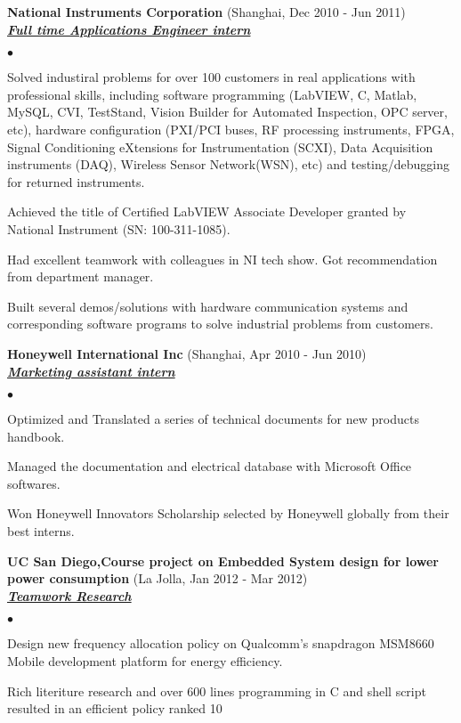 \documentclass{article}
\newcommand{\employer}[3]{{ \textbf{#1} (#2)\\ \underline{\textbf{\emph{#3}}}\\  }}
\newenvironment{achievements}{\begin{list}{$\bullet$}{\topsep 0pt \itemsep -2pt}}{\vspace*{4pt}\end{list}}
\begin{document}
\employer{National Instruments Corporation}{Shanghai, Dec 2010 - Jun 2011}{Full time Applications Engineer intern}
	\begin{achievements}
	\item Solved industiral problems for over 100 customers in real applications with professional skills, including software programming (LabVIEW, C, Matlab, MySQL, CVI, TestStand, Vision Builder for Automated Inspection, OPC server, etc), hardware configuration (PXI/PCI buses, RF processing instruments, FPGA, Signal Conditioning eXtensions for Instrumentation (SCXI), Data Acquisition instruments (DAQ), Wireless Sensor Network(WSN), etc) and testing/debugging for returned instruments.
	\item Achieved the title of Certified LabVIEW Associate Developer granted by National Instrument (SN: 100-311-1085).
	\item Had excellent teamwork with colleagues in NI tech show. Got recommendation from department manager.
	\item Built several demos/solutions with hardware communication systems and corresponding software programs to solve industrial problems from customers.
	\end{achievements}

\employer{Honeywell International Inc}{Shanghai, Apr 2010 - Jun 2010} {Marketing assistant intern}
	\begin{achievements}
	\item Optimized and Translated a series of technical documents for new products handbook.
	\item Managed the documentation and electrical database with Microsoft Office softwares.
	\item Won Honeywell Innovators Scholarship selected by Honeywell globally from their best interns. 
	\end{achievements}

\employer{UC San Diego,Course project on Embedded System design for lower power consumption}{La Jolla, Jan 2012 - Mar 2012}{Teamwork Research}
	\begin{achievements}
	\item Design new frequency allocation policy on Qualcomm’s snapdragon MSM8660 Mobile development platform for energy efficiency. 
	\item Rich literiture research and over 600 lines programming in C and shell script resulted in an efficient policy ranked 10%
	\end{achievements}
\end{document}
